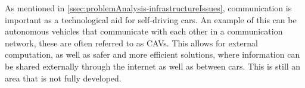As mentioned in \autoref{ssec:problemAnalysis-infrastructureIssues}, communication is important as a technological aid for self-driving cars.
An example of this can be autonomous vehicles that communicate with each other in a communication network, these are often referred to as CAVs.
This allows for external computation, as well as safer and more efficient solutions, where information can be shared externally through the internet as well as between cars.
This is still an area that is not fully developed.
\cite{martinez-diaz_av-prac-theory-issues_2018}
